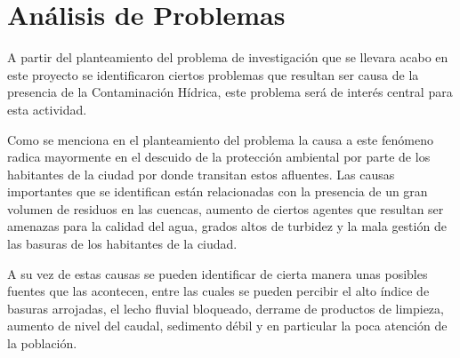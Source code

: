 \section{Análisis de Problemas}

A partir del planteamiento del problema de investigación que se llevara acabo en este proyecto se identificaron ciertos problemas que resultan ser causa de la presencia de la Contaminación Hídrica, este problema será de interés central para esta actividad.

Como se menciona en el planteamiento del problema la causa a este fenómeno radica mayormente en el descuido de la protección ambiental por parte de los habitantes de la ciudad por donde transitan estos afluentes. Las causas importantes que se identifican están relacionadas con la presencia de un gran volumen de residuos en las cuencas, aumento de ciertos agentes que resultan ser amenazas para la calidad del agua, grados altos de turbidez y la mala gestión de las basuras de los habitantes de la ciudad.

A su vez de estas causas se pueden identificar de cierta manera unas posibles fuentes que las acontecen, entre las cuales se pueden percibir el alto índice de basuras arrojadas, el lecho fluvial bloqueado, derrame de productos de limpieza, aumento de nivel del caudal, sedimento débil y en particular la poca atención de la población.
